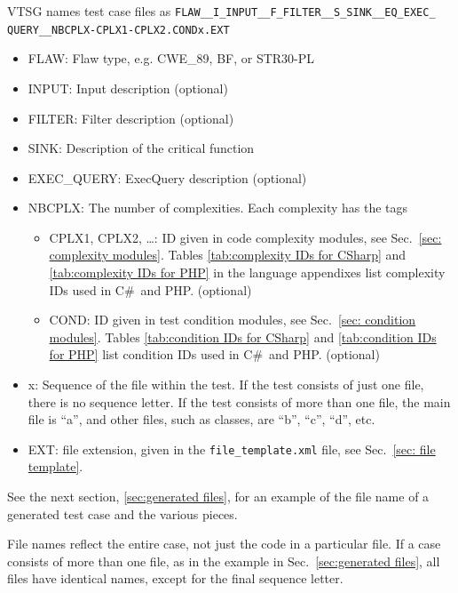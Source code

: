\documentclass[12pt]{article}
\newcommand{\CSharp}{C{\fontseries{b}\selectfont\#}}
\begin{document}
VTSG names test case files as
\verb|FLAW__I_INPUT__F_FILTER__S_SINK__EQ_EXEC_| \\
\verb|QUERY__NBCPLX-CPLX1-CPLX2.CONDx.EXT|
\begin{itemize}
    \item FLAW: Flaw type, e.g. CWE\_89, BF, or STR30-PL
    \item INPUT:  Input description (optional)
    \item FILTER:  Filter description (optional)
    \item SINK:  Description of the critical function
    \item EXEC\_QUERY:  ExecQuery description (optional)
    
    \item NBCPLX:  The number of complexities. Each complexity has the tags 
    \begin{itemize}
        \item CPLX1, CPLX2, \ldots: ID given in 
            code complexity modules, 
            see Sec.~\ref{sec: complexity modules}.
            Tables \ref{tab:complexity IDs for CSharp} and
            \ref{tab:complexity IDs for PHP} in the language appendixes list
            complexity IDs used in \CSharp\ and PHP.
            (optional)
        \item COND: ID given in test condition modules,
            see Sec.~\ref{sec: condition modules}.
            Tables \ref{tab:condition IDs for CSharp} and
            \ref{tab:condition IDs for PHP} list condition
            IDs used in \CSharp\ and PHP. (optional)
    \end{itemize}
    \item x: Sequence of the file within the test.  If the test consists of just one
      file, there is no sequence letter.  If the test consists of more than one file,
      the main file is ``a'', and other files, such as classes, are ``b'', ``c'',
      ``d'', etc.
    \item EXT: file extension, given in the \verb|file_template.xml| file, see
    Sec.~\ref{sec: file template}.
\end{itemize}

See the next section, \ref{sec:generated files}, for an example of the file name of a
generated test case and the various pieces.

File names reflect the entire case, not just the code in a 
particular file.  If a case consists of more than one file, as in the
example in Sec.~\ref{sec:generated files}, all files have
identical names, except for the final sequence letter.
\end{document}

